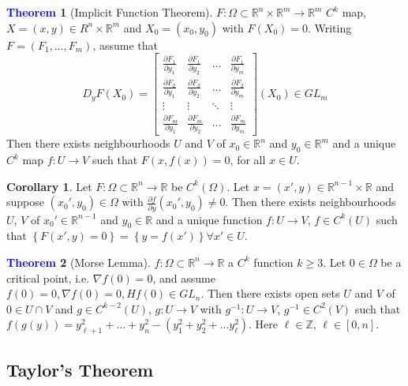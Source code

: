 \documentclass[11pt]{article}
\theoremstyle{definition}
\theoremstyle{definition}
\newcommand{\R}[0]{\mathbb{R}}
\newcommand{\pdv}[2]{\frac{\partial #1}{\partial #2}}
\newtheorem{theorem}{\textcolor{blue}{Theorem}}
\newtheorem{corollary}{Corollary}
\theoremstyle{definition}
\theoremstyle{remark}
\begin{document}
\begin{theorem}[Implicit Function Theorem]
    $F : \Omega \subset \R^n \times \R^m \to \R^m$ $C^k$ map, $X = (x, y) \in R^n \times \R^m$ and
    $X_0 = (x_0, y_0)$ with $F(X_0) = 0$. Writing $F = (F_1, \dots, F_m)$, assume that
    \[
        D_yF(X_0) = \begin{bmatrix}
            \pdv{F_1}{y_1} & \pdv{F_1}{y_2} & \dots & \pdv{F_1}{y_m} \\
            \pdv{F_2}{y_1} & \pdv{F_2}{y_2} & \dots & \pdv{F_2}{y_m} \\
            \vdots & \vdots & \ddots & \vdots \\
            \pdv{F_m}{y_1} & \pdv{F_m}{y_2} & \dots & \pdv{F_m}{y_m} 
        
        \end{bmatrix} (X_0) \in GL_m
    \]       
    Then there exists neighbourhoods $U$ and $V$ of $x_0 \in \R^n$ and $y_0 \in \R^m$ and 
    a unique $C^k$ map $f : U \to V$ such that $F(x, f(x)) = 0$, for all $x \in U$.         
\end{theorem}

\begin{corollary}
    Let $F : \Omega \subset \R^n \to \R$ be $C^k(\Omega)$. Let $x = (x', y) \in \R^{n - 1} \times \R$
    and suppose $(x_0', y_0) \in \Omega$ with $\pdv{f}{y}(x_0', y_0) \neq 0$. Then there exists
    neighbourhoods $U$, $V$ of $x_0' \in \R^{n -1}$ and $y_0 \in \R$ and a unique function 
    $f : U \to V$, $f \in C^k(U)$ such that $\left\{ F(x', y) = 0 \right\} = \left\{ y = f(x') \right\}
    \forall x' \in U$.            
\end{corollary}

\begin{theorem}[Morse Lemma]
    $f : \Omega \subset \R^n \to \R$ a $C^k$ function $k \geq 3$. Let $0 \in \Omega$ be a 
    critical point, i.e. $\nabla f(0) = 0$, and assume $f(0) = 0, \nabla f(0) = 0, Hf(0) \in GL_n$. 
    Then there exists open sets $U$ and $V$ of $0 \in U \cap V$ and $g \in C^{k -2}(U)$, $g : U \to V$
    with $g^{-1} : U \to V$, $g^{-1} \in C^2(V)$ such that $f(g(y)) = 
    y_{\ell + 1}^2 + \dots + y_n^2 - (y_1^2 + y_2^2 + \dots y_\ell^2)$. Here $\ell \in \mathbb{Z}$,
    $\ell \in [0, n]$.            
\end{theorem}

\subsection{Taylor's Theorem}
\end{document}

